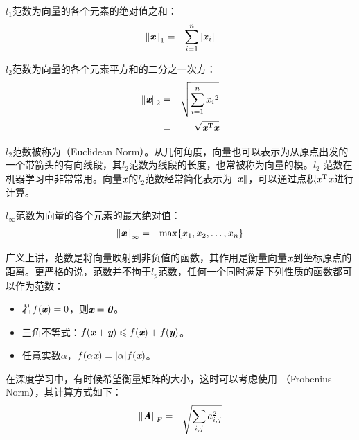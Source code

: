 \parinterval $ l_1 $范数为向量的各个元素的绝对值之和：
\begin{eqnarray}
{\Vert{\textbf{\em x}}\Vert}_1&=&\sum_{i=1}^{n}{\vert x_{i}\vert}
\label{eq:9-15}
\end{eqnarray}

\parinterval $ l_2 $范数为向量的各个元素平方和的二分之一次方：
\begin{eqnarray}
{\Vert{\textbf{\em x}}\Vert}_2&=&\sqrt{\sum_{i=1}^{n}{{x_{i}}^2}} \nonumber \\
                                      &=&\sqrt{{\textbf{\em x}}^{\textrm T}{\textbf{\em x}}}
\label{eq:9-16}
\end{eqnarray}

\parinterval $ l_2 $范数被称为{\small{}}（Euclidean Norm）。从几何角度，向量也可以表示为从原点出发的一个带箭头的有向线段，其$ l_2 $范数为线段的长度，也常被称为向量的模。$ l_2 $ 范数在机器学习中非常常用。向量$ {\textbf{\em x}} $的$ l_2 $范数经常简化表示为$ \Vert{\textbf{\em x}}\Vert $，可以通过点积$ {\textbf{\em x}}^{\textrm T}{\textbf{\em x}} $进行计算。

\parinterval $ l_{\infty} $范数为向量的各个元素的最大绝对值：
\begin{eqnarray}
{\Vert{\textbf{\em x}}\Vert}_{\infty}&=&{\textrm{max}}\{x_1,x_2,\dots,x_n\}
\label{eq:9-17}
\end{eqnarray}

\parinterval 广义上讲，范数是将向量映射到非负值的函数，其作用是衡量向量$ {\textbf{\em x}} $到坐标原点的距离。更严格的说，范数并不拘于$ l_p $范数，任何一个同时满足下列性质的函数都可以作为范数：

\begin{itemize}
\vspace{0.5em}
\item 若$ f({\textbf{\em x}})=0 $，则$ {\textbf{\em x}}={\textbf{\em 0}} $。
\vspace{0.5em}
\item 三角不等式：$ f({\textbf{\em x}}+{\textbf{\em y}})\leqslant f({\textbf{\em x}})+f({\textbf{\em y}}) $。
\vspace{0.5em}
\item 任意实数$ \alpha $，$ f(\alpha {\textbf{\em x}})=\vert \alpha \vert f({\textbf{\em x}}) $。
\vspace{0.5em}
\end{itemize}

\parinterval 在深度学习中，有时候希望衡量矩阵的大小，这时可以考虑使用 {\small{}}（Frobenius Norm），其计算方式如下：
\begin{eqnarray}
{\Vert{\textbf{\em A}}\Vert}_F&=&\sqrt{\sum_{i,j} a_{i,j}^2}
\label{eq:9-18}
\end{eqnarray}

